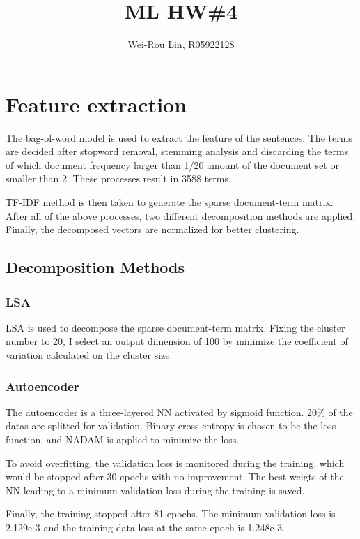 \documentclass[12pt]{article}
\title{\vspace{-1em}ML HW\#4}
\author{\vspace{-2em}Wei-Rou Lin, R05922128}
\date{}
\begin{document}
\twocolumn
\setlength{\columnsep}{2em}
\maketitle
\section{Feature extraction}
  \par The bag-of-word model is used to extract the
  feature of the sentences. The terms are decided
  after stopword removal, stemming analysis and
  discarding the terms of which document frequency
  larger than 1/20 amount of the document set or
  smaller than 2. These processes result in 3588 terms.
  \par TF-IDF method is then taken to generate the sparse
  document-term matrix. After all of the above processes,
  two different decomposition methods are applied.
  Finally, the decomposed vectors are normalized for
  better clustering.
  \subsection{Decomposition Methods}
    \subsubsection{LSA}
    \par LSA is used to decompose the sparse
    document-term matrix. Fixing the cluster number
    to 20, I select an output dimension of 100 by
    minimize the coefficient of variation calculated
    on the cluster size.
    \subsubsection{Autoencoder}
    \par The autoencoder is a three-layered NN activated
    by sigmoid function. 20\% of the datas are splitted for
    validation. Binary-cross-entropy is chosen to be
    the loss function, and NADAM is applied to minimize the loss.
    \par To avoid overfitting, the validation loss is
    monitored during the training, which would be
    stopped after 30 epochs with no improvement.
    The best weigts of the NN leading to a minimum
    validation loss during the training is saved.
    \par Finally, the training stopped after 81 epochs.
    The minimum validation loss is 2.129e-3 and the
    training data loss at the same epoch is 1.248e-3.
\end{document}
